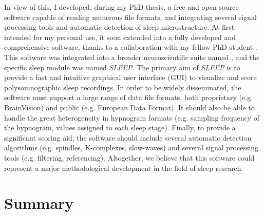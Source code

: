 In view of this, I developed, during my PhD thesis, a free and open-source software capable of reading numerous file formats, and integrating several signal processing tools and automatic detection of sleep microstructure. At first intended for my personal use, it soon extended into a fully developed and comprehensive software, thanks to a collaboration with my fellow PhD student . This software was integrated into a broader neuroscientific suite named , and the specific sleep module was named \textit{SLEEP}. The primary aim of \textit{SLEEP} is to provide a fast and intuitive graphical user interface (GUI) to visualize and score polysomnographic sleep recordings. In order to be widely disseminated, the software must support a large range of data file formats, both proprietary (e.g. BrainVision) and public (e.g. European Data Format). It should also be able to handle the great heterogeneity in hypnogram formats (e.g. sampling frequency of the hypnogram, values assigned to each sleep stage). Finally, to provide a significant scoring aid, the software should include several automatic detection algorithms (e.g. spindles, K-complexes, slow-waves) and several signal processing tools (e.g. filtering, referencing). Altogether, we believe that this software could represent a major methodological development in the field of sleep research.

\section{Summary}
\label{sec:problematic:summary}

